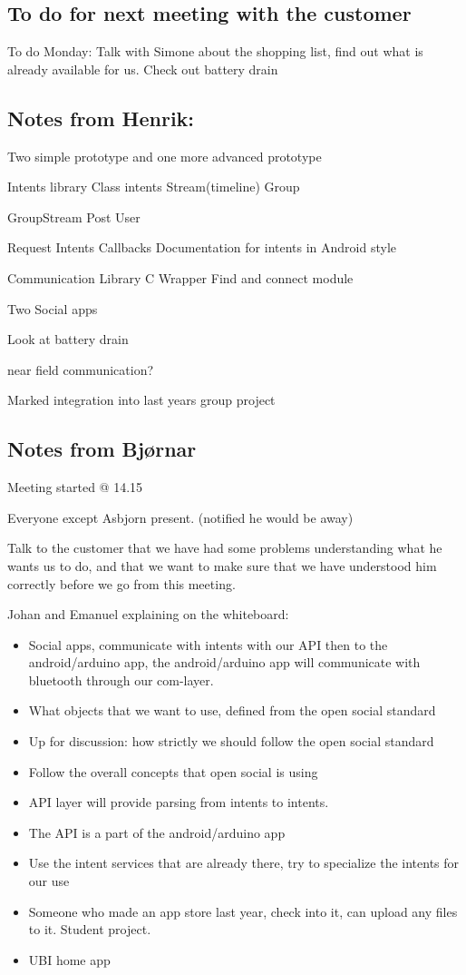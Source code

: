 \subsection{To do for next meeting with the customer}
To do Monday:
Talk with Simone about the shopping list, find out what is already available for us.
Check out battery drain

\subsection{Notes from Henrik:}
Two simple prototype and one more advanced prototype

Intents library
Class intents
Stream(timeline)
Group
                
GroupStream
Post
User                

Request Intents
Callbacks
Documentation for intents in Android style

Communication Library
C Wrapper
Find and connect module

Two Social apps

Look at battery drain

near field communication?

Marked integration into last years group project

\subsection{Notes from Bjørnar}
Meeting started @ 14.15

Everyone except Asbjorn present. (notified he would be away)

Talk to the customer that we have had some problems understanding what he wants us to do, and that we want to  make sure that we have understood him correctly before we go from this meeting.

Johan and Emanuel explaining on the whiteboard:
\begin{itemize}
\item Social apps, communicate with intents with our API then to the android/arduino app, the android/arduino app will communicate with bluetooth through our com-layer.
\item What objects that we want to use, defined from the open social standard
\item Up for discussion: how strictly we should follow the open social standard
\item Follow the overall concepts that open social is using
\item API layer will provide parsing from intents to intents.
\item The API is a part of the android/arduino app
\item Use the intent services that are already there, try to specialize the intents for our use
\item Someone who made an app store last year, check into it, can upload any files to it. Student project.
\item UBI home app
\end{itemize}


